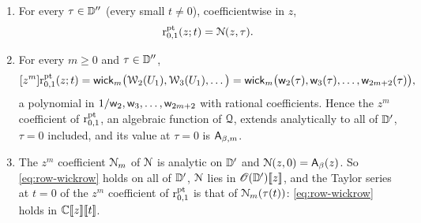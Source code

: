 \begin{prop}[formal]
\label{prop:row-wickrow}
\begin{enumerate}
\item For every $\tau\in\mathbb{D}''$ (every small $t\neq0$), coefficientwise in $z$,
\begin{equation}
\label{eq:row-wickrow}
\mathrm{r}^{\mathrm{pt}}_{0,1}(z;t)=\mathcal{N}(z,\tau).
\end{equation}
\item For every $m\geq0$ and $\tau\in\mathbb{D}''$,
\begin{equation}
\label{eq:row-wick13}
[z^m]\mathrm{r}^{\mathrm{pt}}_{0,1}(z;t)=\mathsf{wick}_m\big(\mathcal{W}_2(U_1),\mathcal{W}_3(U_1),\dots\big)=\mathsf{wick}_m\big(\mathsf{w}_2(\tau),\mathsf{w}_3(\tau),\dots,\mathsf{w}_{2m+2}(\tau)\big),
\end{equation}
a polynomial in $1/\mathsf{w}_2,\mathsf{w}_3,\dots,\mathsf{w}_{2m+2}$ with rational coefficients. Hence the $z^m$ coefficient of $\mathrm{r}^{\mathrm{pt}}_{0,1}$, an algebraic function of $\mathcal{Q}$, extends analytically to all of $\mathbb{D}'$, $\tau=0$ included, and its value at $\tau=0$ is $\mathsf{A}_{\beta,m}$.
\item The $z^m$ coefficient $\mathcal{N}_m$ of $\mathcal{N}$ is analytic on $\mathbb{D}'$ and $\mathcal{N}(z,0)=\mathsf{A}_{\beta}(z)$. So \eqref{eq:row-wickrow} holds on all of $\mathbb{D}'$, $\mathcal{N}$ lies in $\mathscr{O}(\mathbb{D}')[\![ z ]\!]$, and the Taylor series at $t=0$ of the $z^m$ coefficient of $\mathrm{r}^{\mathrm{pt}}_{0,1}$ is that of $\mathcal{N}_m(\tau(t))$: \eqref{eq:row-wickrow} holds in $\mathbb{C}[\![ z ]\!][\![ t ]\!]$.
\end{enumerate}
\end{prop}


